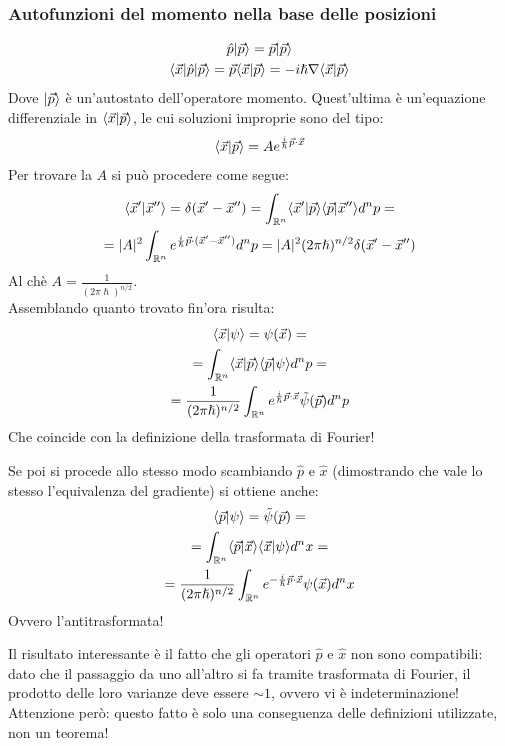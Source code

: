 \subsubsection*{Autofunzioni del momento nella base delle posizioni}
\begin{gather*}
    \hat p |\vec p\ket = \vec p |\vec p\ket \\
    \bra \vec x | \hat p | \vec p\ket = \vec p \bra \vec x | \vec p\ket = -i \hslash \Grad \bra \vec x | \vec p\ket
\end{gather*}
\newcommand{\braketxp}{\braket {\vec x} {\vec p}}
\newcommand{\braketpx}{\braket {\vec p} {\vec x}}
Dove $\Ket {\vec p}$ è un'autostato dell'operatore momento. Quest'ultima è un'equazione differenziale in $\braketxp$, le cui soluzioni improprie sono del tipo:
\[
    \braketxp = A e^{\frac{i}{\hslash} \vec p \cdot \vec x}
\]
Per trovare la $A$ si può procedere come segue:
\begin{gather*}
    \bra \vec x' | \vec x'' \ket = \delta(\vec x' - \vec x'') 
    = \rnint \bra \vec x' | \vec p \ket \bra \vec p | \vec x'' \ket d^np = \\
    = |A|^2 \rnint e^{\frac{i}{\hslash} \vec p \cdot (\vec x' - \vec x'')} d^np
    = |A|^2 (2 \pi \hslash)^{n/2} \delta(\vec x' - \vec x'')
\end{gather*}
Al chè $A = \frac{1}{(2 \pi \hslash)^{n/2}}$.\\
Assemblando quanto trovato fin'ora risulta:
\begin{gather*}
    \bra \vec x | \psi \ket = \psi(\vec x) = \\
    = \rnint \braketxp \braket {\vec p}{\psi} d^np = \\
    = \frac{1}{(2 \pi \hslash)^{n/2}} \rnint e^{\frac{i}{\hslash} \vec p \cdot \vec x} \tilde\psi(\vec p) d^np
\end{gather*}
Che coincide con la definizione della trasformata di Fourier!

Se poi si procede allo stesso modo scambiando $\hat p$ e $\hat x$ (dimostrando che vale lo stesso l'equivalenza del gradiente) si ottiene anche:
\begin{gather*}
    \bra \vec p | \psi \ket = \tilde\psi(\vec p) = \\
    = \rnint \braketpx \braket {\vec x}{\psi} d^nx = \\
    = \frac{1}{(2 \pi \hslash)^{n/2}} \rnint e^{-\frac{i}{\hslash} \vec p \cdot \vec x} \psi(\vec x) d^nx
\end{gather*}
Ovvero l'antitrasformata!

Il risultato interessante è il fatto che gli operatori $\hat p$ e $\hat x$ non sono compatibili: dato che il passaggio da uno all'altro si fa tramite trasformata di Fourier, il prodotto delle loro varianze deve essere $\sim 1$, ovvero vi è indeterminazione! Attenzione però: questo fatto è solo una conseguenza delle definizioni utilizzate, non un teorema!